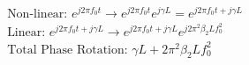\documentclass[10pt,letterpaper]{article}
\newcommand{\Q}[1]{\textbf{Question #1)}}
\begin{document}
\begin{equation}\begin{split}
&\text{Non-linear: } e^{j2\pi f_0t}\to e^{j2\pi f_0t}e^{j\gamma L}=e^{j2\pi f_0t+j\gamma L}
\\&
\text{Linear: } e^{j2\pi f_0t+j\gamma L}\to e^{j2\pi f_0t+j\gamma L}e^{j2\pi^2\beta_2Lf_0^2}
\\&
\text{Total Phase Rotation: }\gamma L+2\pi^2\beta_2Lf_0^2
\end{split}\end{equation}
%
%
%
%
%
\end{document}
